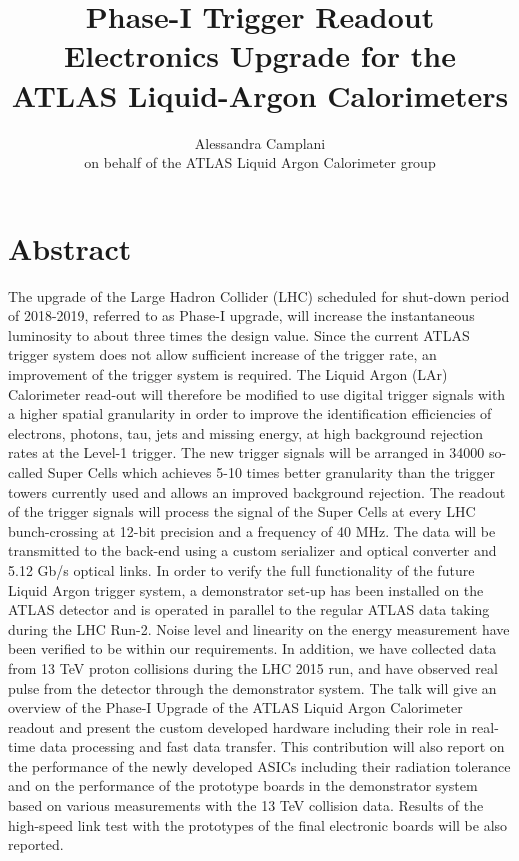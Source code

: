 \documentclass{llncs}
\title{Phase-I Trigger Readout Electronics Upgrade for the ATLAS Liquid-Argon Calorimeters}
\author{Alessandra Camplani\inst{1}\inst{2} \\ 
on behalf of the ATLAS Liquid Argon Calorimeter group}
\institute{Universt\'a degli Studi di Milano
\and INFN Milano \\
\email{alessandra.camplani@mi.infn.it}}
\begin{document}
\maketitle

\section*{Abstract}
The upgrade of the Large Hadron Collider (LHC) scheduled for shut-down period of 2018-2019, referred to as Phase-I upgrade, will increase the instantaneous luminosity to about three times the design value. Since the current ATLAS trigger system does not allow sufficient increase of the trigger rate, an improvement of the trigger system is required. The Liquid Argon (LAr) Calorimeter read-out will therefore be modified to use digital trigger signals with a higher spatial granularity in order to improve the identification efficiencies of electrons, photons, tau, jets and missing energy, at high background rejection rates at the Level-1 trigger. The new trigger signals will be arranged in 34000 so-called Super Cells which achieves 5-10 times better granularity than the trigger towers currently used and allows an improved background rejection. The readout of the trigger signals will process the signal of the Super Cells at every LHC bunch-crossing at 12-bit precision and a frequency of 40 MHz. The data will be transmitted to the back-end using a custom serializer and optical converter and 5.12 Gb/s optical links. In order to verify the full functionality of the future Liquid Argon trigger system, a demonstrator set-up has been installed on the ATLAS detector and is operated in parallel to the regular ATLAS data taking during the LHC Run-2. Noise level and linearity on the energy measurement have been verified to be within our requirements. In addition, we have collected data from 13 TeV proton collisions during the LHC 2015 run, and have observed real pulse from the detector through the demonstrator system. The talk will give an overview of the Phase-I Upgrade of the ATLAS Liquid Argon Calorimeter readout and present the custom developed hardware including their role in real-time data processing and fast data transfer. This contribution will also report on the performance of the newly developed ASICs including their radiation tolerance and on the performance of the prototype boards in the demonstrator system based on various measurements with the 13 TeV collision data. Results of the high-speed link test with the prototypes of the final electronic boards will be also reported.
\end{document}
